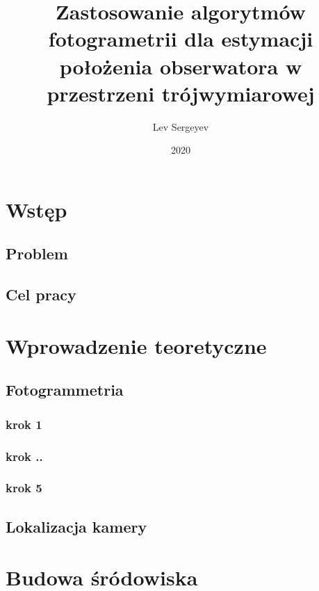 \documentclass[eng,printmode]{mgr}
\title{Zastosowanie algorytmów fotogrametrii dla estymacji położenia obserwatora w przestrzeni trójwymiarowej}
\author{Lev Sergeyev}
\date{2020} %
\begin{document}

\maketitle %

\tableofcontents %



\chapter{Wstęp}
\section{Problem}
\section{Cel pracy}

\chapter{Wprowadzenie teoretyczne}
\section{Fotogrammetria}
\subsection{krok 1}
\subsection{krok ..}
\subsection{krok 5}
\section{Lokalizacja kamery}

\chapter{Budowa śródowiska}
\end{document}
